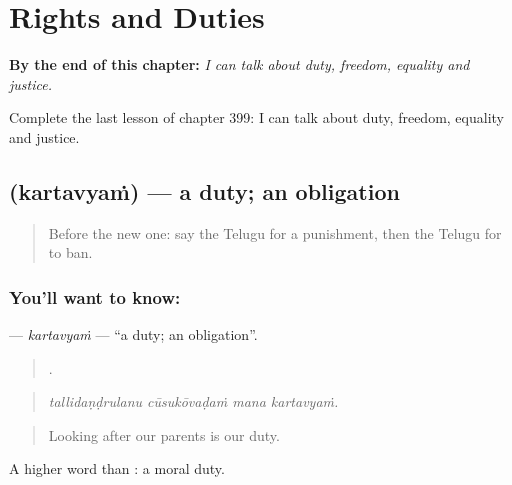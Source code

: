 
\chapter{Rights and Duties}
\label{ch:te-rights-and-duties}

\begin{chapteropening}
\textbf{By the end of this chapter:} \emph{I can talk about duty, freedom, equality and justice.}

Complete the last lesson of chapter 399: I can talk about duty, freedom, equality and justice.
\end{chapteropening}

\section[\texorpdfstring{\te{కర్తవ్యం} (kartavyaṁ)}{కర్తవ్యం (kartavyaṁ)}]{ (kartavyaṁ) — a duty; an obligation}

\label{lesson:TE-C399-kartavyam}



\begin{quote}
Before the new one: say the Telugu for a punishment, then the Telugu for to ban.
\end{quote}

\subsection*{You'll want to know: }
\textbf{} — \emph{kartavyaṁ} — \textquotedblleft{}a duty; an obligation\textquotedblright{}.

\begin{quote}
   .
\end{quote}

\begin{quote}
\emph{tallidaṇḍrulanu cūsukōvaḍaṁ mana kartavyaṁ.}
\end{quote}

\begin{quote}
Looking after our parents is our duty.
\end{quote}

A higher word than : a moral duty.


